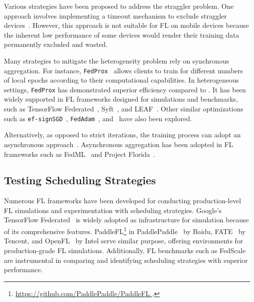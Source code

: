 \documentclass[conference]{IEEEtran}
\begin{document}
Various strategies have been proposed to address the straggler problem.
One approach involves implementing a timeout mechanism to exclude
straggler devices~\cite{bonawitz2019towards}.
However, this approach is not suitable for FL on mobile devices because
the inherent low performance of some devices would render
their training data permanently excluded and wasted.

\newcommand{\FedProx}{\texttt{FedProx}}
\newcommand{\TFF}{TensorFlow Federated~\cite{tff}}

Many strategies to mitigate the heterogeneity problem rely on
synchronous aggregation.
For instance,
\FedProx{}~\cite{li2020federated}
allows clients to train for different numbers of local epochs according to
their computational capabilities.
In heterogeneous settings,
\FedProx{} has demonstrated superior efficiency compared to \FedAvg{} .
It has been widely supported in FL frameworks designed for simulations and
benchmarks, such as
\TFF{},
Syft~\cite{ryffel2018generic,Ziller2021,hall2021syft}, and
LEAF~\cite{caldas2018leaf}.
Other similar optimizations such as
\verb|ef-signSGD|~\cite{karimireddy2019error},
\verb|FedAdam|~\cite{reddi2020adaptive},
and~\cite{luo2021cost} have also been explored.

\newcommand{\FedML}{FedML~\cite{he2020fedml}}
\newcommand{\Florida}{Project Florida~\cite{madrigal2023project}}

Alternatively,
as opposed to strict iterations,
the training process can adopt an
asynchronous approach~\cite{chilimbi2014project,zhu2022online,huba2022papaya}.
Asynchronous aggregation has been adopted in
FL frameworks such as \FedML{} and \Florida{}.

\subsection{Testing Scheduling Strategies}

Numerous FL frameworks have been developed for
conducting production-level FL simulations and
experimentation with scheduling strategies.
Google's \TFF{} is widely adopted as infrastructure for simulation because of
its comprehensive features.
PaddleFL\footnote{\url{
    https://github.com/PaddlePaddle/PaddleFL
}.} in PaddlePaddle~\cite{ma2019paddlepaddle} by Baidu,
FATE~\cite{liu2021fate} by Tencent, and
OpenFL~\cite{patrick2022openfl} by Intel
serve similar purpose,
offering environments for production-grade FL simulations.
Additionally,
FL benchmarks such as FedScale~\cite{lai2022fedscale} are instrumental in
comparing and identifying scheduling strategies with superior performance.
\end{document}
